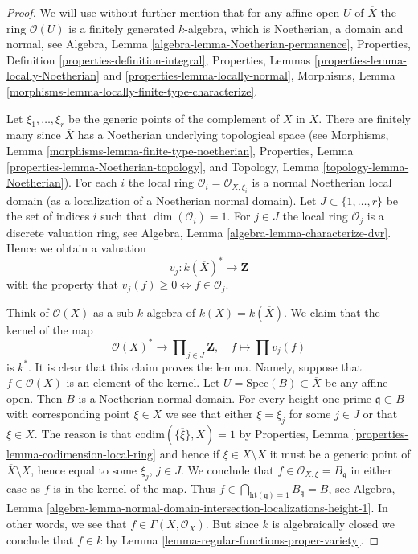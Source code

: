 \begin{proof}
We will use without further mention that for any affine open $U$ of
$\overline{X}$ the ring $\mathcal{O}(U)$ is a finitely generated
$k$-algebra, which is Noetherian, a domain and normal, see
Algebra, Lemma \ref{algebra-lemma-Noetherian-permanence},
Properties, Definition \ref{properties-definition-integral},
Properties, Lemmas \ref{properties-lemma-locally-Noetherian} and
\ref{properties-lemma-locally-normal},
Morphisms, Lemma \ref{morphisms-lemma-locally-finite-type-characterize}.

\medskip\noindent
Let $\xi_1, \ldots, \xi_r$ be the generic points of the complement of $X$
in $\overline{X}$. There are finitely many since $\overline{X}$ has a
Noetherian underlying topological space (see
Morphisms, Lemma \ref{morphisms-lemma-finite-type-noetherian},
Properties, Lemma \ref{properties-lemma-Noetherian-topology}, and
Topology, Lemma \ref{topology-lemma-Noetherian}).
For each $i$ the local ring $\mathcal{O}_i = \mathcal{O}_{X, \xi_i}$
is a normal Noetherian local domain (as a localization of a
Noetherian normal domain). Let $J \subset \{1, \ldots, r\}$ be the set of
indices $i$ such that $\dim(\mathcal{O}_i) = 1$. For $j \in J$ the
local ring $\mathcal{O}_j$ is a discrete valuation ring, see
Algebra, Lemma \ref{algebra-lemma-characterize-dvr}.
Hence we obtain a valuation
$$
v_j : k(\overline{X})^* \longrightarrow \mathbf{Z}
$$
with the property that $v_j(f) \geq 0 \Leftrightarrow f \in \mathcal{O}_j$.

\medskip\noindent
Think of $\mathcal{O}(X)$ as a sub $k$-algebra of $k(X) = k(\overline{X})$.
We claim that the kernel of the map
$$
\mathcal{O}(X)^* \longrightarrow
\prod\nolimits_{j \in J} \mathbf{Z},
\quad
f \longmapsto \prod v_j(f)
$$
is $k^*$. It is clear that this claim proves the lemma.
Namely, suppose that $f \in \mathcal{O}(X)$ is an element of the kernel.
Let $U = \text{Spec}(B) \subset \overline{X}$ be any affine open.
Then $B$ is a Noetherian normal domain.
For every height one prime $\mathfrak q \subset B$ with corresponding
point $\xi \in X$ we see that either $\xi = \xi_j$ for some $j \in J$
or that $\xi \in X$. The reason is that
$\text{codim}(\overline{\{\xi\}}, \overline{X}) = 1$ by
Properties, Lemma \ref{properties-lemma-codimension-local-ring}
and hence if $\xi \in \overline{X} \setminus X$ it must be a
generic point of $\overline{X} \setminus X$, hence equal to some
$\xi_j$, $j \in J$.
We conclude that $f \in \mathcal{O}_{X, \xi} = B_{\mathfrak q}$
in either case as $f$ is in the kernel of the map. Thus
$f \in \bigcap_{\text{ht}(\mathfrak q) = 1} B_{\mathfrak q} = B$, see
Algebra, Lemma
\ref{algebra-lemma-normal-domain-intersection-localizations-height-1}.
In other words, we see that $f \in \Gamma(X, \mathcal{O}_X)$.
But since $k$ is algebraically closed we conclude that
$f \in k$ by
Lemma \ref{lemma-regular-functions-proper-variety}.
\end{proof}

